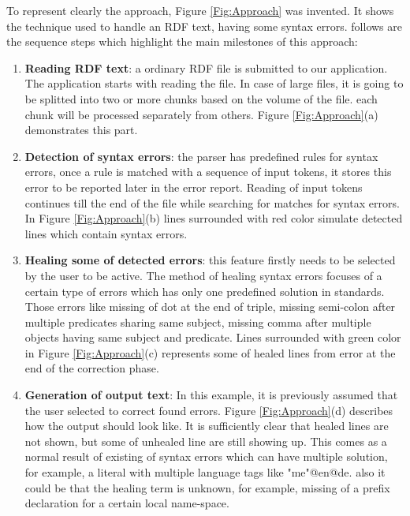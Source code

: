  To represent clearly the approach, {Figure \ref{Fig:Approach}} was invented. It shows the technique used to handle an RDF text, having some syntax errors. follows are the sequence steps which highlight the main milestones of this approach:
 \begin{enumerate}[label=(\alph*)]
\item \textbf{Reading RDF text}: a ordinary RDF file is submitted to our application. The application starts with reading the file. In case of large files, it is going to be splitted into two or more chunks based on the volume of the file. each chunk will be processed separately from others.  {Figure \ref{Fig:Approach}}(a) demonstrates this part. 
\item \textbf{Detection of syntax errors}: the parser has predefined rules for syntax errors, once a rule is matched with a sequence of input tokens, it stores this error to be reported later in the error report. Reading of input tokens continues till the end of the file while searching for matches for syntax errors. In  {Figure \ref{Fig:Approach}}(b) lines surrounded with red color simulate detected lines which contain syntax errors. 
\item \textbf {Healing some of detected errors}: this feature firstly needs to be selected by the user to be active. The method of healing syntax errors focuses of a certain type of errors which has only one predefined solution in standards. Those errors like missing of dot at the end of triple, missing semi-colon after multiple predicates sharing same subject, missing comma after multiple objects having same subject and predicate. Lines surrounded with green color in {Figure \ref{Fig:Approach}}(c) represents some of healed lines from error at the end of the correction phase.  
\item\textbf {Generation of output text}: In this example, it is previously assumed that the user selected to correct found errors.  {Figure \ref{Fig:Approach}}(d) describes how the output should look like. It is sufficiently clear that healed lines are not shown, but some of unhealed line are still showing up. This comes as a normal result of existing of syntax errors which can have multiple solution, for example, a literal with multiple language tags like "me"@en@de. also it could be that the healing term is unknown, for example, missing of a prefix declaration for a certain local name-space. 
\end{enumerate} 
